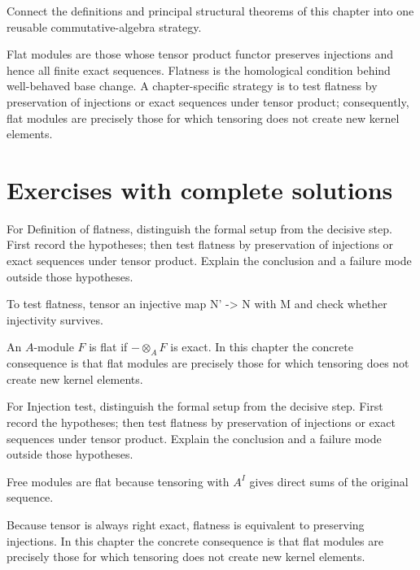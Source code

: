\begin{problem}\label{prob:v14-problem-12}
Connect the definitions and principal structural theorems of this chapter into one reusable commutative-algebra strategy.
\end{problem}
\begin{solution}
Flat modules are those whose tensor product functor preserves injections and hence all finite exact sequences. Flatness is the homological condition behind well-behaved base change. A chapter-specific strategy is to test flatness by preservation of injections or exact sequences under tensor product; consequently, flat modules are precisely those for which tensoring does not create new kernel elements.
\end{solution}

\section{Exercises with complete solutions}

\begin{exercise}\label{exr:v14-01}
For Definition of flatness, distinguish the formal setup from the decisive step. First record the hypotheses; then test flatness by preservation of injections or exact sequences under tensor product. Explain the conclusion and a failure mode outside those hypotheses.
\end{exercise}
\begin{hint}
To test flatness, tensor an injective map N' -> N with M and check whether injectivity survives.
\end{hint}
\begin{solution}
An $A$-module $F$ is flat if $-\otimes_A F$ is exact. In this chapter the concrete consequence is that flat modules are precisely those for which tensoring does not create new kernel elements.
\end{solution}

\begin{exercise}\label{exr:v14-02}
For Injection test, distinguish the formal setup from the decisive step. First record the hypotheses; then test flatness by preservation of injections or exact sequences under tensor product. Explain the conclusion and a failure mode outside those hypotheses.
\end{exercise}
\begin{hint}
Free modules are flat because tensoring with \(A^I\) gives direct sums of the original sequence.
\end{hint}
\begin{solution}
Because tensor is always right exact, flatness is equivalent to preserving injections. In this chapter the concrete consequence is that flat modules are precisely those for which tensoring does not create new kernel elements.
\end{solution}

